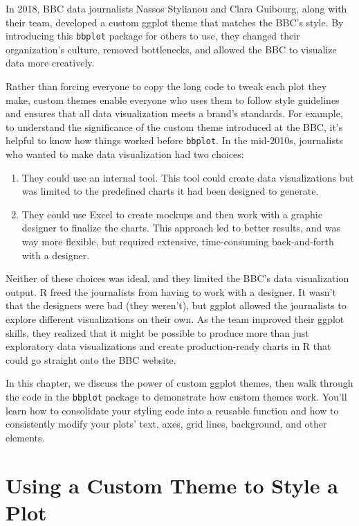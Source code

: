 \documentclass[
]{book}
\begin{document}
In 2018, BBC data journalists Nassos Stylianou and Clara Guibourg, along with their team, developed a custom ggplot theme that matches the BBC's style. By introducing this \texttt{bbplot} package for others to use, they changed their organization's culture, removed bottlenecks, and allowed the BBC to visualize data more creatively.

Rather than forcing everyone to copy the long code to tweak each plot they make, custom themes enable everyone who uses them to follow style guidelines and ensures that all data visualization meets a brand's standards. For example, to understand the significance of the custom theme introduced at the BBC, it's helpful to know how things worked before \texttt{bbplot}. In the mid-2010s, journalists who wanted to make data visualization had two choices:

\begin{enumerate}
\def\labelenumi{\arabic{enumi}.}
\item
  They could use an internal tool. This tool could create data visualizations but was limited to the predefined charts it had been designed to generate.
\item
  They could use Excel to create mockups and then work with a graphic designer to finalize the charts. This approach led to better results, and was way more flexible, but required extensive, time-consuming back-and-forth with a designer.
\end{enumerate}

Neither of these choices was ideal, and they limited the BBC's data visualization output. R freed the journalists from having to work with a designer. It wasn't that the designers were bad (they weren't), but ggplot allowed the journalists to explore different visualizations on their own. As the team improved their ggplot skills, they realized that it might be possible to produce more than just exploratory data visualizations and create production-ready charts in R that could go straight onto the BBC website.

In this chapter, we discuss the power of custom ggplot themes, then walk through the code in the \texttt{bbplot} package to demonstrate how custom themes work. You'll learn how to consolidate your styling code into a reusable function and how to consistently modify your plots' text, axes, grid lines, background, and other elements.

\hypertarget{using-a-custom-theme-to-style-a-plot}{%
\section*{Using a Custom Theme to Style a Plot}\label{using-a-custom-theme-to-style-a-plot}}
\end{document}
